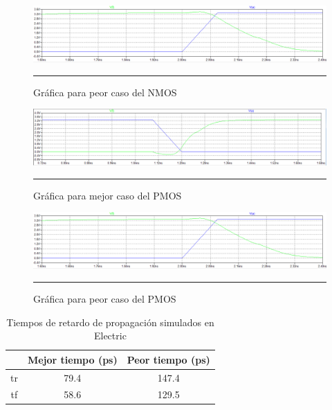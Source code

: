 \documentclass[12pt,a4paper]{article} %
\begin{document}
{\begin{figure}[htbp]
\begin{center}
    \includegraphics[scale=0.5]{./peor caso red nmos.png}
    \rule{35em}{0.5pt}
  \caption[Captura]{Gráfica para peor caso del NMOS}
  \label{fig:CircuitoFO2}
  \end{center}
\end{figure}

\begin{figure}[htbp]
\begin{center}
    \includegraphics[scale=0.5]{./mejor caso red pmos.png}
    \rule{35em}{0.5pt}
  \caption[Captura]{Gráfica para mejor caso del PMOS}
  \label{fig:CircuitoFO2}
  \end{center}
\end{figure}


\begin{figure}[htbp]
\begin{center}
    \includegraphics[scale=0.5]{./peor caso red nmos.png}
    \rule{35em}{0.5pt}
  \caption[Captura]{Gráfica para peor caso del PMOS}
  \label{fig:CircuitoFO2}
  \end{center}
\end{figure}

\begin{table}\label{table:Tabla_propagación}
\begin{center}
\begin{tabular}{c||c||c}
  & Mejor tiempo (ps) & Peor tiempo (ps)\\
\hline
\hline
tr & 79.4 & 147.4 \\
tf & 58.6 & 129.5 \\
\hline
\end{tabular}
\caption{Tiempos de retardo de propagación simulados en Electric}
\end{center}
\end{table}


}
\end{document}

